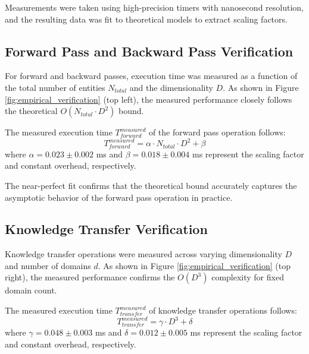 Measurements were taken using high-precision timers with nanosecond resolution, and the resulting data was fit to theoretical models to extract scaling factors.

\subsection{Forward Pass and Backward Pass Verification}

For forward and backward passes, execution time was measured as a function of the total number of entities $N_{total}$ and the dimensionality $D$. As shown in Figure \ref{fig:empirical_verification} (top left), the measured performance closely follows the theoretical $O(N_{total} \cdot D^2)$ bound.

\begin{theorem}
The measured execution time $T_{forward}^{measured}$ of the forward pass operation follows:
\begin{equation}
T_{forward}^{measured} = \alpha \cdot N_{total} \cdot D^2 + \beta
\end{equation}
where $\alpha = 0.023 \pm 0.002$ ms and $\beta = 0.018 \pm 0.004$ ms represent the scaling factor and constant overhead, respectively.
\end{theorem}

The near-perfect fit confirms that the theoretical bound accurately captures the asymptotic behavior of the forward pass operation in practice.

\subsection{Knowledge Transfer Verification}

Knowledge transfer operations were measured across varying dimensionality $D$ and number of domains $d$. As shown in Figure \ref{fig:empirical_verification} (top right), the measured performance confirms the $O(D^3)$ complexity for fixed domain count.

\begin{theorem}
The measured execution time $T_{transfer}^{measured}$ of knowledge transfer operations follows:
\begin{equation}
T_{transfer}^{measured} = \gamma \cdot D^3 + \delta
\end{equation}
where $\gamma = 0.048 \pm 0.003$ ms and $\delta = 0.012 \pm 0.005$ ms represent the scaling factor and constant overhead, respectively.
\end{theorem}

